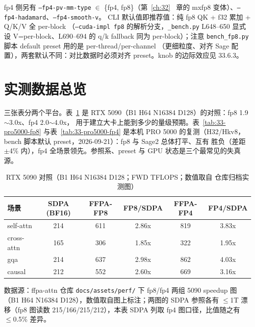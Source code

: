 fp4 侧另有 \texttt{--fp4-pv-mm-type} $\in$ \{fp4, fp8\}（第~\ref{ch:32}~
章的 mxfp8 变体）、\texttt{--fp4-hadamard}、\texttt{--fp4-smooth-v}。
CLI 默认值即推荐值：纯 fp8 QK + f32 累加 + Q/K/V 全 per-block
（\texttt{--cuda-impl fp8} 的解析分支，\texttt{\_bench.py} L648--650
显式设 V=per-block、L690--694 的 q/k fallback 同为 per-block）；注意
\texttt{bench\_fp8.py} 脚本 default preset 用的是 per-thread/per-channel
（更细粒度、对齐 Sage 配置），两套默认不同：对比数据时必须对齐
preset。knob 的边际效应见 33.6.3。

\section{实测数据总览}

三张表分两个平台。表~\ref{tab:33-5090} 是 RTX 5090（B1 H64
N16384 D128）的对照：fp8 1.9$\sim$3.0x、fp4 2.0$\sim$4.0x，
用于建立大卡上能到多少的量级预期。表~\ref{tab:33-pro5000-fp8}
与表~\ref{tab:33-pro5000-fp4} 是本机 PRO 5000 的复测（H32/Hkv8，
bench 脚本默认 preset，2026-09-21）：fp8 与 Sage2 总体打平、互有
胜负（差距 $\pm$4\% 内），fp4 全场景领先。参照系、preset 与 GPU
状态是三个最常见的失真源。

\begin{table}[!htbp]
  \centering\small
  \caption{RTX 5090 对照（B1 H64 N16384 D128；FWD TFLOPS；数值取自
  仓库归档实测图）}\label{tab:33-5090}
  \begin{tabular}{lccccc}
    \toprule
    场景 & SDPA (BF16) & FFPA-FP8 & FP8/SDPA & FFPA-FP4 & FP4/SDPA \\
    \midrule
    self-attn  & 214 & 611 & 2.86x & 819 & 3.83x \\
    cross-attn & 165 & 306 & 1.85x & 322 & 1.95x \\
    gqa        & 214 & 637 & 2.98x & 862 & 4.03x \\
    causal     & 212 & 552 & 2.60x & 669 & 3.16x \\
    \bottomrule
  \end{tabular}

  \par\vspace{4pt}
  {\footnotesize 数据源：ffpa-attn 仓库
  \texttt{docs/\allowbreak{}assets/\allowbreak{}perf/} 下 fp8/fp4 两组
  5090 speedup 图（B1 H64 N16384 D128），数值取自图上标注；两图的
  SDPA 参照各有 $\le$1T 漂移（fp8 图读数 215/166/215/212），本表
  SDPA 列取 fp4 图口径，比值随之有 $\le$0.5\% 差异。\par}
\end{table}

